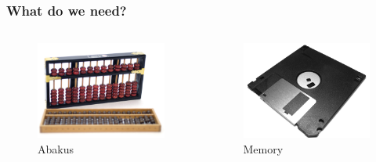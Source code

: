 \documentclass{beamer}
\begin{document}
\begin{frame}\frametitle{What do we need?}
  \begin{columns}
  \begin{column}{6cm}
  \begin{figure}
  \includegraphics[width=1\textwidth]{abakus}
  \caption{Abakus}
  \end{figure}
  \end{column}
  \begin{column}{6cm}
  \begin{figure}
  \includegraphics[width=1\textwidth]{memory}
  \caption{Memory}
  \end{figure}
  \end{column}
  \end{columns}
\end{frame}
\end{document}
